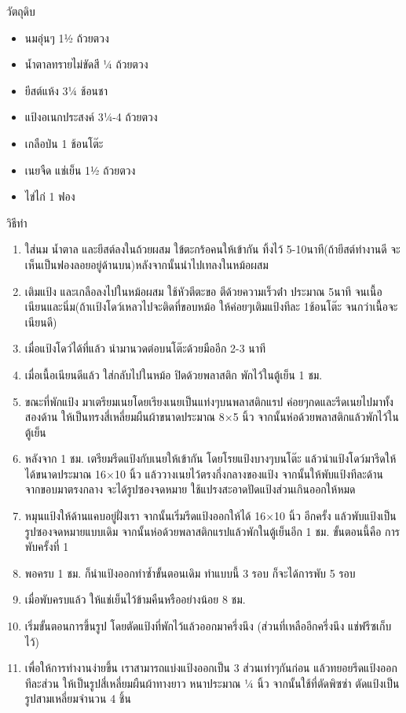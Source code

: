 \documentclass{report}
\begin{document}
วัตถุดิบ
\begin{itemize}
	\item นมอุ่นๆ 1½ ถ้วยตวง
	\item น้ำตาลทรายไม่ขัดสี ¼ ถ้วยตวง
	\item ยีสต์แห้ง 3¼ ช้อนชา
	\item แป้งอเนกประสงค์ 3¼-4 ถ้วยตวง
	\item เกลือป่น 1 ช้อนโต๊ะ
	\item เนยจืด แช่เย็น 1½ ถ้วยตวง
	\item ไข่ไก่ 1 ฟอง
\end{itemize} \par
วิธีทำ 
\begin{enumerate} 
	\item ใส่นม น้ำตาล และยีสต์ลงในถ้วยผสม ใข้ตะกร้อคนให้เข้ากัน ทิ้งไว้ 5-10นาที(ถ้ายีสต์ทำงานดี จะเห็นเป็นฟองลอยอยู่ด้านบน)หลังจากนั้นนำไปเทลงในหม้อผสม 
	\item เติมแป้ง และเกลือลงไปในหม้อผสม ใช้หัวตีตะขอ ตีด้วยความเร็วต่ํา ประมาณ 5นาที จนเนื้อเนียนและนิ่ม(ถ้าเเป้งโดว์เหลวไปจะติดที่ขอบหม้อ ให้ค่อยๆเติมแป้งทีละ 1ช้อนโต๊ะ จนกว่าเนื้อจะเนียนดี)
	\item เมื่อแป้งโดว์ได้ที่แล้ว นำมานวดต่อบนโต๊ะด้วยมืออีก 2-3 นาที
	\item เมื่อเนื้อเนียนดีแล้ว ใส่กลับไปในหม้อ ปิดด้วยพลาสติก พักไว้ในตู้เย็น 1 ชม.
	\item ขณะที่พักแป้ง มาเตรียมเนยโดยเรียงเนยเป็นแท่งๆบนพลาสติกแรป ค่อยๆกดและรีดเนยไปมาทั้งสองด้าน ให้เป็นทรงสี่เหลี่ยมผืนผ้าขนาดประมาณ 8×5 นิ้ว จากนั้นห่อด้วยพลาสติกแล้วพักไว้ในตู้เย็น
	\item หลังจาก 1 ชม. เตรียมรีดแป้งกับเนยให้เข้ากัน โดยโรยแป้งบางๆบนโต๊ะ แล้วนำแป้งโดว์มารีดให้ได้ขนาดประมาณ 16×10 นิ้ว แล้ววางเนยไว้ตรงกึ่งกลางของแป้ง จากนั้นให้พับแป้งทีละด้าน จากขอบมาตรงกลาง จะได้รูปซองจดหมาย ใช้แปรงสะอาดปัดแป้งส่วนเกินออกให้หมด
	\item หมุนแป้งให้ด้านแคบอยู่ฝั่งเรา จากนั้นเริ่มรีดแป้งออกให้ได้ 16×10 นิ้ว อีกครั้ง แล้วพับแป้งเป็นรูปซองจดหมายแบบเดิม จากนั้นห่อด้วยพลาสติกแรปแล้วพักในตู้เย็นอีก 1 ชม. ขั้นตอนนี้คือ การพับครั้งที่ 1
	\item พอครบ 1 ชม. ก็นำแป้งออกทำซ้ำขั้นตอนเดิม ทำแบบนี้ 3 รอบ ก็จะได้การพับ 5 รอบ
	\item เมื่อพับครบแล้ว ให้แช่เย็นไว้ข้ามคืนหรืออย่างน้อย 8 ชม.
	\item เริ่มขั้นตอนการขึ้นรูป โดยตัดแป้งที่พักไว้แล้วออกมาครึ่งนึง (ส่วนที่เหลืออีกครึ่งนึง แช่ฟรีซเก็บไว้)
	\item เพื่อให้การทำงานง่ายขึ้น เราสามารถแบ่งแป้งออกเป็น 3 ส่วนเท่าๆกันก่อน แล้วทยอยรีดแป้งออกทีละส่วน ให้เป็นรูปสี่เหลี่ยมผืนผ้าทางยาว หนาประมาณ ¼ นิ้ว จากนั้นใช้ที่ตัดพิซซ่า ตัดแป้งเป็นรูปสามเหลี่ยมจำนวน 4 ชิ้น

\end{enumerate}
\end{document}
